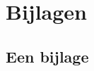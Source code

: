 
\section*{Bijlagen} %
\label{sec:een-titel}

\appendix

\renewcommand{\thesubsection}{\Alph{subsection}}

\subsection{Een bijlage} %
\label{sub:nog-een-titel}

\lipsum[1]
